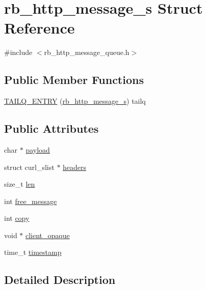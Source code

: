 \hypertarget{structrb__http__message__s}{}\section{rb\+\_\+http\+\_\+message\+\_\+s Struct Reference}
\label{structrb__http__message__s}


{\ttfamily \#include $<$rb\+\_\+http\+\_\+message\+\_\+queue.\+h$>$}

\subsection*{Public Member Functions}
\begin{DoxyCompactItemize}
\item 
\hyperlink{structrb__http__message__s_a1443be49b0a12165e9ed6c801284a56b}{T\+A\+I\+L\+Q\+\_\+\+E\+N\+T\+R\+Y} (\hyperlink{structrb__http__message__s}{rb\+\_\+http\+\_\+message\+\_\+s}) tailq
\end{DoxyCompactItemize}
\subsection*{Public Attributes}
\begin{DoxyCompactItemize}
\item 
char $\ast$ \hyperlink{structrb__http__message__s_a70cd28f794d09eb47cf19a37fb7ba42b}{payload}
\item 
struct curl\+\_\+slist $\ast$ \hyperlink{structrb__http__message__s_ae12176a1bd60ed536eda95e2c530acc4}{headers}
\item 
size\+\_\+t \hyperlink{structrb__http__message__s_a8c352ee939f1cd197bf009583e61552f}{len}
\item 
int \hyperlink{structrb__http__message__s_acbfdd79b7ec041a7b7e0edac1da72d30}{free\+\_\+message}
\item 
int \hyperlink{structrb__http__message__s_aceda798a9af4f28a6dc89b273e6c348a}{copy}
\item 
void $\ast$ \hyperlink{structrb__http__message__s_aa25eb69a09434b70882260a326dd704c}{client\+\_\+opaque}
\item 
time\+\_\+t \hyperlink{structrb__http__message__s_ac11579bf2388ba0b7baea1c50a94d347}{timestamp}
\end{DoxyCompactItemize}


\subsection{Detailed Description}


